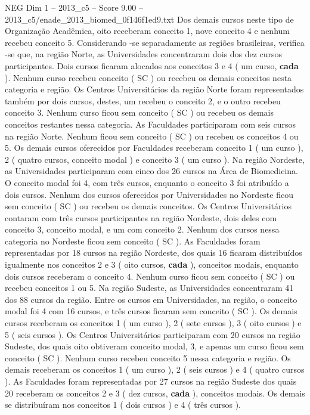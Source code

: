 \begin{textsample}{NEG Dim 1 – 2013\_c5 – Score 9.00 – 2013\_c5/enade\_2013\_biomed\_0f146f1ed9.txt}
Dos demais cursos neste tipo de Organização Acadêmica, oito receberam conceito 1, nove conceito 4 e nenhum recebeu conceito 5.
Considerando -se separadamente as regiões brasileiras, verifica -se que, na região Norte, as Universidades concentraram dois dos dez cursos participantes.
Dois cursos ficaram alocados aos conceitos 3 e 4 ( um curso, \textbf{cada} ).
Nenhum curso recebeu conceito ( SC ) ou recebeu os demais conceitos nesta categoria e região.
Os Centros Universitários da região Norte foram representados também por dois cursos, destes, um recebeu o conceito 2, e o outro recebeu conceito 3.
Nenhum curso ficou sem conceito ( SC ) ou recebeu os demais conceitos restantes nessa categoria.
As Faculdades participaram com seis cursos na região Norte.
Nenhum ficou sem conceito ( SC ) ou recebeu os conceitos 4 ou 5.
Os demais cursos oferecidos por Faculdades receberam conceito 1 ( um curso ), 2 ( quatro cursos, conceito modal ) e conceito 3 ( um curso ).
Na região Nordeste, as Universidades participaram com cinco dos 26 cursos na Área de Biomedicina.
O conceito modal foi 4, com três cursos, enquanto o conceito 3 foi atribuído a dois cursos.
Nenhum dos cursos oferecidos por Universidades no Nordeste ficou sem conceito ( SC ) ou recebeu os demais conceitos.
Os Centros Universitários contaram com três cursos participantes na região Nordeste, dois deles com conceito 3, conceito modal, e um com conceito 2.
Nenhum dos cursos nessa categoria no Nordeste ficou sem conceito ( SC ).
As Faculdades foram representadas por 18 cursos na região Nordeste, dos quais 16 ficaram distribuídos igualmente nos conceitos 2 e 3 ( oito cursos, \textbf{cada} ), conceitos modais, enquanto dois cursos receberam o conceito 4.
Nenhum curso ficou sem conceito ( SC ) ou recebeu conceitos 1 ou 5.
Na região Sudeste, as Universidades concentraram 41 dos 88 cursos da região.
Entre os cursos em Universidades, na região, o conceito modal foi 4 com 16 cursos, e três cursos ficaram sem conceito ( SC ).
Os demais cursos receberam os conceitos 1 ( um curso ), 2 ( sete cursos ), 3 ( oito cursos ) e 5 ( seis cursos ).
Os Centros Universitários participaram com 20 cursos na região Sudeste, dos quais oito obtiveram conceito modal, 3, e apenas um curso ficou sem conceito ( SC ).
Nenhum curso recebeu conceito 5 nessa categoria e região.
Os demais receberam os conceitos 1 ( um curso ), 2 ( seis cursos ) e 4 ( quatro cursos ).
As Faculdades foram representadas por 27 cursos na região Sudeste dos quais 20 receberam os conceitos 2 e 3 ( dez cursos, \textbf{cada} ), conceitos modais.
Os demais se distribuíram nos conceitos 1 ( dois cursos ) e 4 ( três cursos ).

\end{textsample}
